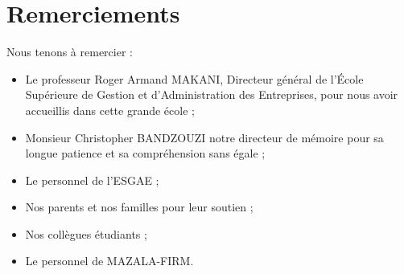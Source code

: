 \chapter*{Remerciements}

Nous tenons à remercier :
\begin{itemize}
  \item {
      Le professeur Roger Armand MAKANI, Directeur général de l’École
      Supérieure de Gestion et d’Administration des Entreprises,
      pour nous avoir accueillis dans cette grande école ;
    }
  \item {
      Monsieur Christopher BANDZOUZI notre directeur de mémoire pour sa
      longue patience et sa compréhension sans égale ;
    }
  \item {
      Le personnel de l’ESGAE ;
    }

  \item {
      Nos parents et nos familles pour leur soutien ;
    }

  \item {
      Nos collègues étudiants ;
    }

  \item {
      Le personnel de MAZALA-FIRM.
    }

\end{itemize}
